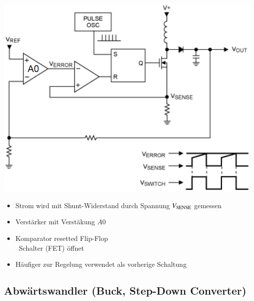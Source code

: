 \begin{minipage}{0.42\columnwidth}
    \includegraphics[width=\columnwidth]{images/regelung_ausgangsspannung_current.png}
\end{minipage}
\hfill
\begin{minipage}{0.56\columnwidth}
    \begin{itemize}
        \item Strom wird mit Shunt-Widerstand durch Spannung $V_{\rm SENSE}$ gemessen
        \item Verstärker mit Verstäkung $A0$
        \item Komparator resetted Flip-Flop\\
        \textrightarrow\ Schalter (FET) öffnet
        \item Häufiger zur Regelung verwendet als vorherige Schaltung
    \end{itemize}
\end{minipage}


\subsection{Abwärtswandler (Buck, Step-Down Converter)}

\begin{minipage}[c]{0.4\columnwidth}
    
\end{minipage}
\hfill
\begin{minipage}[c]{0.58\columnwidth}
    
\end{minipage}

